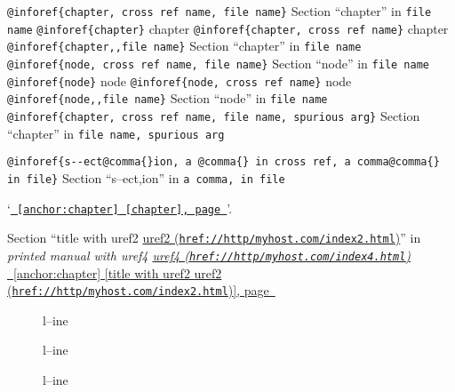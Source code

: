 \documentclass{book}
\newcommand\GNUTexinfotablestyleemph[1]{{\normalfont\emph{#1}}}%
\begin{document}
\begin{titlepage}
\texttt{@inforef\{chapter,\ cross ref name,\ file name\}} Section ``chapter'' in \texttt{file name}
\texttt{@inforef\{chapter\}} chapter
\texttt{@inforef\{chapter,\ cross ref name\}} chapter
\texttt{@inforef\{chapter{,}{,}file name\}} Section ``chapter'' in \texttt{file name}
\texttt{@inforef\{node,\ cross ref name,\ file name\}} Section ``node'' in \texttt{file name}
\texttt{@inforef\{node\}} node
\texttt{@inforef\{node,\ cross ref name\}} node
\texttt{@inforef\{node{,}{,}file name\}} Section ``node'' in \texttt{file name}
\texttt{@inforef\{chapter,\ cross ref name,\ file name,\ spurious arg\}} Section ``chapter'' in \texttt{file name,\ spurious arg}

\texttt{@inforef\{s{-}{-}ect@comma\{\}ion,\ a @comma\{\} in cross
ref,\ a comma@comma\{\} in file\}}
Section ``s--ect,ion'' in \texttt{a comma, in file}

`\texttt{\hyperref[anchor:chapter]{\chaptername~\ref*{anchor:chapter} [chapter], page~\pageref*{anchor:chapter}}}'.

Section ``title with uref2 \href{href://http/myhost.com/index2.html}{uref2 (\nolinkurl{href://http/myhost.com/index2.html})}'' in \textsl{printed manual with uref4 \href{href://http/myhost.com/index4.html}{uref4 (\nolinkurl{href://http/myhost.com/index4.html})}}
\hyperref[anchor:chapter]{\chaptername~\ref*{anchor:chapter} [title with uref2 \href{href://http/myhost.com/index2.html}{uref2 (\nolinkurl{href://http/myhost.com/index2.html})}], page~\pageref*{anchor:chapter}}

\begin{description}
\item[{\parbox[b]{\linewidth}{%
\textbf{a--strong}}}]
l--ine
\end{description}

\begin{description}
\item[{\parbox[b]{\linewidth}{%
a--asis\\
\index[cp]{a--asis@\texttt{a{-}{-}asis}}%
b
\index[cp]{b@\texttt{b}}%
}}]
l--ine
\end{description}

\begin{description}
\item[{\parbox[b]{\linewidth}{%
\GNUTexinfotablestyleemph{a}\\
\index[fn]{a@\texttt{a}}%
\index[cp]{index entry between item and itemx}%
\GNUTexinfotablestyleemph{b}
\index[fn]{b@\texttt{b}}%
}}]
l--ine
\end{description}


\end{titlepage}
\end{document}

